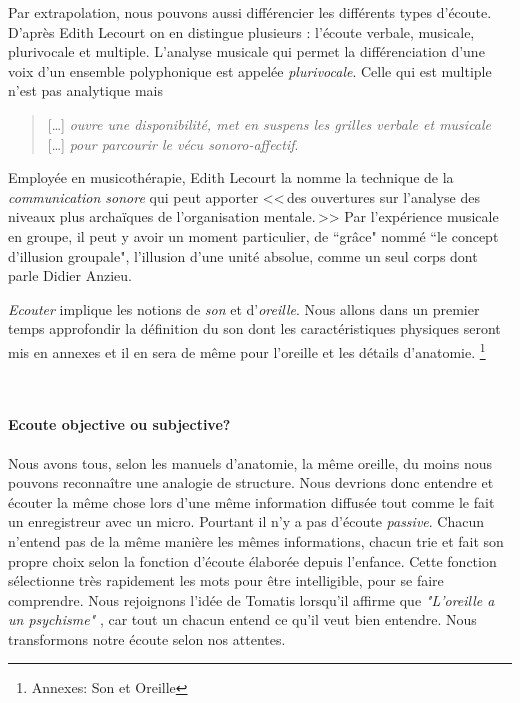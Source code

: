 Par extrapolation, nous pouvons aussi différencier les différents types d'écoute. D'après Edith Lecourt \autocite[ch. 10 <<\,De l'écoute verbale à l'écoute musicale\,>>, p. 182.]{lecourt:decouvrir}
 on en distingue plusieurs : l'écoute verbale, musicale, plurivocale et multiple.
 L'analyse musicale qui permet la différenciation d'une voix d'un ensemble polyphonique est appelée \emph{plurivocale}. Celle qui est multiple n'est pas analytique  mais 
 \begin{quote}
 	 [\ldots] \textit{ouvre une disponibilité, met en suspens les grilles verbale et musicale} [\ldots] \emph{pour parcourir le vécu sonoro-affectif}\autocite[p. 183]{lecourt:decouvrir}.
 \end{quote}
 Employée en musicothérapie, Edith Lecourt la nomme la technique de la  \emph{communication sonore} qui peut apporter 
 <<\,des ouvertures sur l'analyse des niveaux plus archaïques de l'organisation mentale.\,>>\autocite[p. 154]{lecourt:decouvrir}	
 Par l'expérience musicale en groupe, il peut y avoir un moment particulier, de ``grâce"  nommé ``le concept d'illusion groupale", l'illusion d'une unité absolue, comme un seul corps\autocite{anzieu:groupal} dont parle Didier Anzieu.


 
\emph{Ecouter} implique les notions de \emph{son} et
d'\emph{oreille}. Nous allons dans un premier temps approfondir  la
définition du son dont les caractéristiques physiques seront mis en
annexes et il en sera de même pour l'oreille et les détails
d'anatomie. \footnote{Annexes: Son et Oreille}

\







\paragraph{Ecoute objective ou subjective?}

Nous avons tous,
selon les manuels d'anatomie, la même
oreille, du moins nous pouvons reconnaître une analogie de structure. Nous devrions donc entendre et écouter la même chose
lors d'une même information diffusée tout comme le fait un enregistreur avec un micro. Pourtant il n'y a pas d'écoute \emph{passive}. Chacun n'entend pas de la même manière les mêmes
informations, chacun trie et fait son propre choix selon la fonction
d'écoute élaborée depuis l'enfance. Cette fonction sélectionne très
rapidement les mots pour être intelligible, pour se faire
comprendre. Nous rejoignons l'idée de Tomatis lorsqu'il affirme que
\textit{"L'oreille a un psychisme"} , car tout un chacun entend ce qu'il veut bien
entendre. \autocite{tomatis_oreille_1998} 
Nous transformons notre écoute selon nos attentes.

